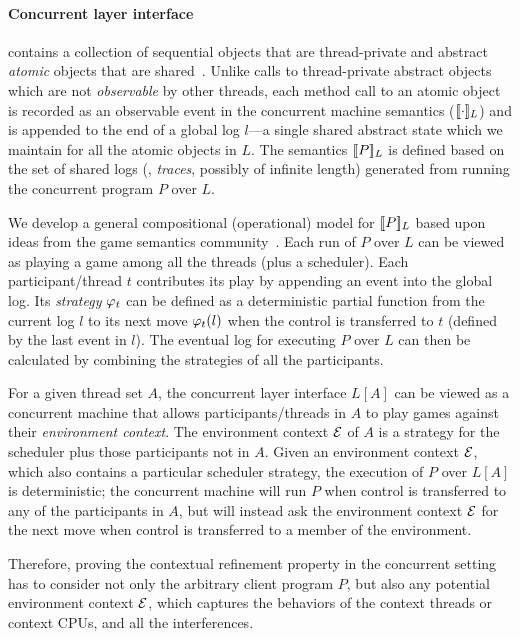 \paragraph{Concurrent layer interface}
contains a collection of
sequential objects that are thread-private
and abstract {\em atomic} objects that are shared~\cite{Herlihy08book}. Unlike calls to thread-private abstract objects  which are not {\em observable} by other
threads, each method call to an atomic object is recorded as an 
observable event in the concurrent machine semantics
($\sem{L}{\cdot}$) and is appended to the end of a global log $l$---a
single shared abstract state which we maintain for all the atomic
objects in $L$. The semantics $\sem{L}{P}$ is defined based
on the set of shared logs (\ie, {\em{}traces}, possibly of
infinite length) generated from running the concurrent program $P$
over $L$.

We develop a general compositional (operational) model for
$\sem{L}{P}$ based upon ideas from the game semantics
community~\cite{gsinvite}. Each run of $P$ over $L$ can be viewed as
playing a game among all the threads (plus a scheduler). Each
participant/thread $t$ contributes its play by appending an event into the
global log. Its {\em strategy} $\strat{t}$ can  be defined as a
deterministic partial function from the current log $l$ to its next
move $\strat{t}(l)$ when the control is transferred to $t$
(defined by the last event in $l$). The
eventual log for executing $P$ over $L$ can then be calculated by
combining the strategies of all the participants.

For a given  thread set $A$, the concurrent layer interface $L[A]$ 
can be viewed as a 
concurrent machine that allows participants/threads in $A$
to play games against their {\em environment context}.
The environment context $\oracle$ of $A$ is a strategy for
 the scheduler plus those participants not in $A$.  Given an environment context $\oracle$,
which also contains a particular scheduler strategy, the execution of
$P$ over $L[A]$ is deterministic; the concurrent machine will
run $P$ when control is transferred to any of the participants in $A$, but
will instead ask the environment context $\oracle$ for the next move when 
control is transferred to a member of the environment.

Therefore, proving the contextual refinement property in the concurrent
setting has to consider not only the arbitrary client program $P$,
but also any potential environment context $\oracle$,
which captures the behaviors
of the context threads or context CPUs,
and all the interferences.

